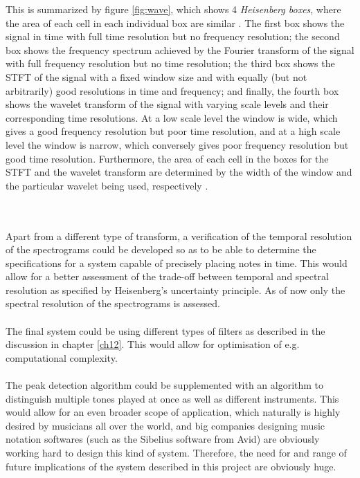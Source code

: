 This is summarized by figure \ref{fig:wave}, which shows 4 \textit{Heisenberg boxes}, where the area of each cell in each individual box are similar \cite{page 410, Wang}. The first box shows the signal in time with full time resolution but no frequency resolution; the second box shows the frequency spectrum achieved by the Fourier transform of the signal with full frequency resolution but no time resolution; the third box shows the STFT of the signal with a fixed window size and with equally (but not arbitrarily) good resolutions in time and frequency; and finally, the fourth box shows the wavelet transform of the signal with varying scale levels and their corresponding time resolutions. At a low scale level the window is wide, which gives a good frequency resolution but poor time resolution, and at a high scale level the window is narrow, which conversely gives poor frequency resolution but good time resolution. Furthermore, the area of each cell in the boxes for the STFT and the wavelet transform are determined by the width of the window and the particular wavelet being used, respectively \cite{pages 409-410, Wang} \cite{page 43-44, wave_tut}.


\\ \\
Apart from a different type of transform, a verification of the temporal resolution of the spectrograms could be developed so as to be able to determine the specifications for a system capable of precisely placing notes in time. This would allow for a better assessment of the trade-off between temporal and spectral resolution as specified by Heisenberg's uncertainty principle. As of now only the spectral resolution of the spectrograms is assessed.
\\\\
The final system could be using different types of filters as described in the discussion in chapter \ref{ch12}. This would allow for optimisation of e.g. computational complexity.
\\\\
The peak detection algorithm could be supplemented with an algorithm to distinguish multiple tones played at once as well as different instruments. This would allow for an even broader scope of application, which naturally is highly desired by musicians all over the world, and big companies designing music notation softwares (such as the Sibelius software from Avid) are obviously working hard to design this kind of system. Therefore, the need for and range of future implications of the system described in this project are obviously huge.